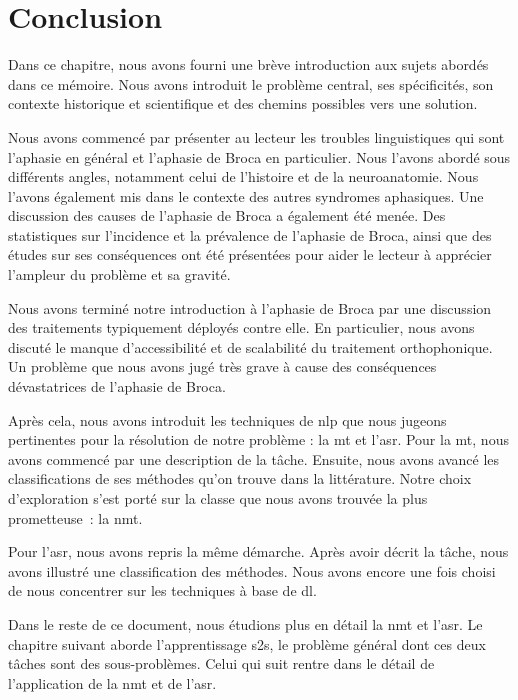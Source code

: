 \section{Conclusion}

Dans ce chapitre, nous avons fourni une brève introduction aux sujets abordés dans ce mémoire.
Nous avons introduit le problème central, ses spécificités, son contexte historique et scientifique 
et des chemins possibles vers une solution.

Nous avons commencé par présenter au lecteur les troubles linguistiques qui sont 
l'aphasie en général et l'aphasie de Broca en particulier.
Nous l'avons abordé sous différents angles, notamment celui de l'histoire et de la neuroanatomie.
Nous l'avons également mis dans le contexte des autres syndromes aphasiques.
Une discussion des causes de l'aphasie de Broca a également été menée.
Des statistiques sur l'incidence et la prévalence de l'aphasie de Broca,
ainsi que des études sur ses conséquences ont été présentées
pour aider le lecteur à apprécier l'ampleur du problème et sa gravité.

Nous avons terminé notre introduction à l'aphasie de Broca 
par une discussion des traitements typiquement déployés contre elle.
En particulier, nous avons discuté le manque d'accessibilité et de scalabilité du traitement orthophonique.
Un problème que nous avons jugé très grave à cause des conséquences dévastatrices de l'aphasie de Broca.

Après cela, nous avons introduit les techniques de \gls{nlp} que nous jugeons pertinentes
pour la résolution de notre problème : la \gls{mt} et l'\gls{asr}.
Pour la \gls{mt}, nous avons commencé par une description de la tâche.
Ensuite, nous avons avancé les classifications de ses méthodes qu'on trouve dans la littérature.
Notre choix d'exploration s'est porté sur la classe que nous avons trouvée la plus prometteuse~:
la \gls{nmt}.

Pour l'\gls{asr}, nous avons repris la même démarche.
Après avoir décrit la tâche, nous avons illustré une classification des méthodes.
Nous avons encore une fois choisi de nous concentrer sur les techniques à base de \gls{dl}.

Dans le reste de ce document, nous étudions plus en détail la \gls{nmt} et l'\gls{asr}.
Le chapitre suivant aborde l'apprentissage \gls{s2s}, 
le problème général dont ces deux tâches sont des sous-problèmes.
Celui qui suit rentre dans le détail de l'application de la \gls{nmt} et de l'\gls{asr}.
